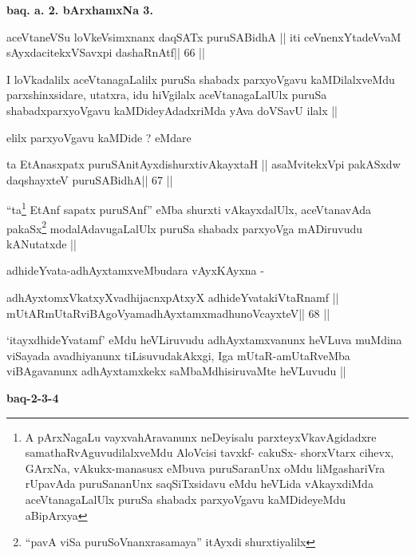 \begin{center}
\textbf{baq. a. 2. bArxhamxNa 3.}
\end{center}

\begin{shl}
aceVtaneVSu loVkeV\s simxnanx daqSATx puruSABidhA ||
iti ceVnenxYtadeVvaM sAyxdacitekxVSavxpi dashaRnAtf\hfill || 66 ||
\end{shl}

\begin{artha}
I loVkadalilx aceVtanagaLalilx puruSa shabadx parxyoVgavu
kaMDilalxveMdu parxshinxsidare, utatxra, idu hiVgilalx
aceVtanagaLalUlx puruSa shabadxparxyoVgavu kaMDideyAdadxriMda yAva
doVSavU ilalx ||

elilx parxyoVgavu kaMDide ? eMdare
\end{artha}

\begin{shl}
ta EtAnasxpatx puruSAnitAyxdishurxtivAkayxtaH ||
asaMvitekxV\s pi pakASxdw daqshayxteV puruSABidhA\hfill || 67 ||
\end{shl}

\begin{artha}
``ta\footnote{A pArxNagaLu vayxvahAravanunx neDeyisalu
    parxteyxVkavAgidadxre samathaRvAguvudilalxveMdu AloVcisi tavxkf-
    cakuSx- shorxVtarx cihevx, GArxNa, vAkukx-manasusx eMbuva
    puruSaranUnx oMdu liMgashariVra rUpavAda puruSananUnx
    saqSiTxsidavu eMdu heVLida vAkayxdiMda aceVtanagaLalUlx puruSa
    shabadx parxyoVgavu kaMDideyeMdu aBipArxya} EtAnf sapatx puruSAnf'' eMba shurxti vAkayxdalUlx,
  aceVtanavAda pakaSx\footnote{``pavA viSa puruSoV\s nanxrasamaya''
    itAyxdi shurxtiyalilx } modalAdavugaLalUlx puruSa shabadx
  parxyoVga mADiruvudu kANutatxde ||

adhideYvata-adhAyxtamxveMbudara vAyxKAyxna -
\end{artha}

\begin{shl}
adhAyxtomxVkatxyXvadhijacnxpAtxyX adhideYvatakiVtaRnamf ||
mUtARmUtaRviBAgoV\s yamadhAyxtamxmadhunoVcayxteV\hfill || 68 ||
\end{shl}

\begin{artha}
`itayxdhideYvatamf' eMdu heVLiruvudu adhAyxtamxvanunx heVLuva muMdina
  viSayada avadhiyanunx tiLisuvudakAkxgi, Iga mUtaR-amUtaRveMba
  viBAgavanunx adhAyxtamxkekx saMbaMdhisiruvaMte heVLuvudu ||
\end{artha}

\medskip

\begin{center}
{\textbf{baq-2-3-4}}
\end{center}

